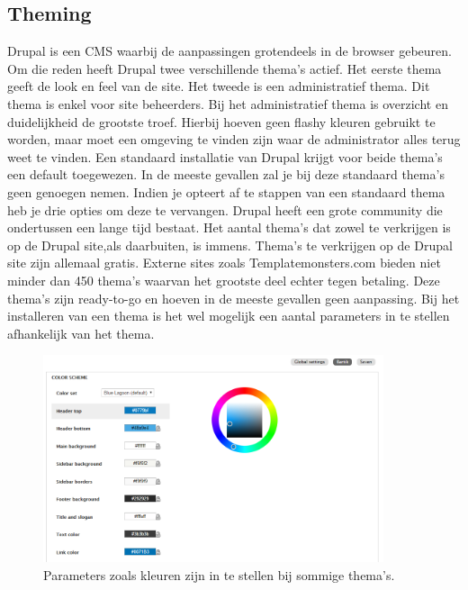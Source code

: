 \subsection{Theming}
Drupal is een CMS waarbij de aanpassingen grotendeels in de browser gebeuren. Om die reden heeft Drupal twee verschillende thema's actief. Het eerste thema geeft de look en feel van de site. Het tweede is een administratief thema. Dit thema is enkel voor site beheerders. 
Bij het administratief thema is overzicht en duidelijkheid de grootste troef. Hierbij hoeven geen flashy kleuren gebruikt te worden, maar moet een omgeving te vinden zijn waar de administrator alles terug weet te vinden.
\newline\newline
Een standaard installatie van Drupal krijgt voor beide thema's een default toegewezen. In de meeste gevallen zal je bij deze standaard thema's geen genoegen nemen. Indien je opteert af te stappen van een standaard thema heb je drie opties om deze te vervangen.
\newline\newline
Drupal heeft een grote community die ondertussen een lange tijd bestaat. Het aantal thema's dat zowel te verkrijgen is op de Drupal site,als daarbuiten, is immens. Thema's te verkrijgen op de Drupal site zijn allemaal gratis. Externe sites zoals Templatemonsters.com bieden niet minder dan 450 thema's waarvan het grootste deel echter tegen betaling. Deze thema's zijn ready-to-go en hoeven in de meeste gevallen geen aanpassing. Bij het installeren van een thema is het wel mogelijk een aantal parameters in te stellen afhankelijk van het thema.

\begin{figure}[!ht]
  \includegraphics[width=100mm]{img/dr-theme-colors.png}
  \centering
  \caption{Parameters zoals kleuren zijn in te stellen bij sommige thema's.}
  \label{fig:Drupal thema kleuren.}
\end{figure}


